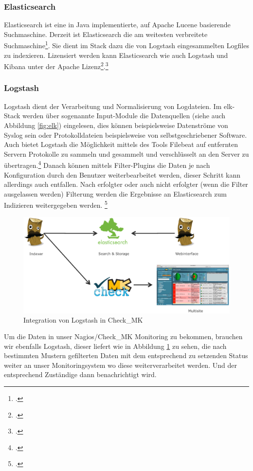 \documentclass[12pt,a4paper,parskip,listof=totoc,bibliography=totoc]{scrreprt}
\begin{document}
	\subsubsection{Elasticsearch}
	Elasticsearch ist eine in Java implementierte, auf Apache Lucene basierende Suchmaschine. Derzeit ist Elasticsearch die am weitesten verbreitete Suchmaschine\footcite{dbenginesranking}. Sie dient im Stack dazu die von Logstash eingesammelten Logfiles zu indexieren. Lizensiert werden kann Elasticsearch wie auch Logstash und Kibana unter der Apache Lizenz\footcite{apachelicence}.\footcite{elasticsearch}
	\subsubsection{Logstash}
	Logstash dient der Verarbeitung und Normalisierung von Logdateien. Im \acrshort{elk}-Stack werden über sogenannte Input-Module die Datenquellen (siehe auch Abbildung \ref{fig:elk}) eingelesen, dies können beispielsweise Datenströme von Syslog sein oder Protokolldateien beispielsweise von selbstgeschriebener Software. Auch bietet Logstash die Möglichkeit mittels des Tools Filebeat auf entfernten Servern Protokolle zu sammeln und gesammelt und verschlüsselt an den Server zu übertragen.\footcite{filebeat} Danach können mittels Filter-Plugins die Daten je nach Konfiguration durch den Benutzer weiterbearbeitet werden, dieser Schritt kann allerdings auch entfallen. Nach erfolgter oder auch nicht erfolgter (wenn die Filter ausgelassen werden) Filterung werden die Ergebnisse an Elasticsearch zum Indizieren weitergegeben werden. \footcite{logstash}
	\begin{figure}[h!]
	\centering
	\includegraphics[width=1\linewidth]{pics/logstashcheckmk}
	\caption{Integration von Logstash in Check\_MK}
	\label{fig:logstashcheckmk}
	\end{figure}
	Um die Daten in unser Nagios/Check\_MK Monitoring zu bekommen, brauchen wir ebenfalls Logstash, dieser liefert wie in Abbildung \ref{fig:logstashcheckmk} zu sehen, die nach bestimmten Mustern gefilterten Daten mit dem entsprechend zu setzenden Status weiter an unser Monitoringsystem wo diese weiterverarbeitet werden. Und der entsprechend Zuständige dann benachrichtigt wird.
\end{document}
